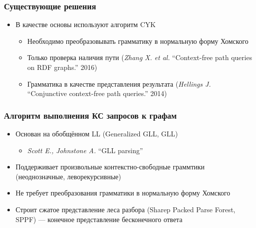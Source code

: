 \documentclass[xcolor=table]{beamer}
\begin{document}
\begin{frame}[fragile]
  \transwipe[direction=90]
  \frametitle{Существующие решения}
  \begin{itemize}
  \item В качестве основы используют алгоритм CYK
    \begin{itemize}
        \item Необходимо преобразовывать грамматику в нормальную форму Хомского
        \item Только проверка наличия пути (\emph{Zhang X. et al.} ``Context-free path queries on RDF graphs.'' 2016)
        \item Грамматика в качестве представления результата (\emph{Hellings J.} ``Conjunctive context-free path queries.'' 2014)
    \end{itemize}
  \end{itemize}

\end{frame}

\begin{frame}[fragile]
  \transwipe[direction=90]
  \frametitle{Алгоритм выполнения КС запросов к графам}

\begin{itemize} 
\item Основан на обобщённом LL (Generalized GLL, GLL)
\begin{itemize} 
  \item \emph{Scott E., Johnstone A.} ``GLL parsing''
\end{itemize}
\item Поддерживает произвольные контекстно-свободные граммтики (неоднозначные, леворекурсивные)
\item Не требует преобразования грамматики в нормальную форму Хомского
\item Строит сжатое представление леса разбора (Sharep Packed Parse Forest, SPPF) --- конечное представление бесконечного ответа
\end{itemize}
\end{frame}
\end{document}
